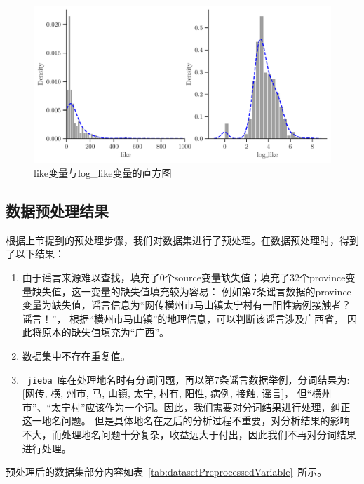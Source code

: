 \begin{figure}[!ht]
    \includegraphics[width=\linewidth]{../figures/loglike_like_hist}
    \caption{like变量与log\_like变量的直方图}
    \label{fig:like_loglike_hist}
\end{figure}

\subsection{数据预处理结果}

根据上节提到的预处理步骤，我们对数据集进行了预处理。在数据预处理时，得到了以下结果：
\begin{enumerate}
    \item 由于谣言来源难以查找，填充了0个source变量缺失值；填充了32个province变量缺失值，这一变量的缺失值填充较为容易：
    例如第7条谣言数据的province变量为缺失值，谣言信息为“网传横州市马山镇太宁村有一阳性病例接触者？谣言！”，
    根据“横州市马山镇”的地理信息，可以判断该谣言涉及广西省，
    因此将原本的缺失值填充为“广西”。
    \item 数据集中不存在重复值。
    \item ~\verb|jieba|~库在处理地名时有分词问题，再以第7条谣言数据举例，分词结果为:[网传, 横, 州市, 马, 山镇, 太宁, 村有, 阳性, 病例, 接触, 谣言]，
    但“横州市”、“太宁村”应该作为一个词。因此，我们需要对分词结果进行处理，纠正这一地名问题。
    但是具体地名在之后的分析过程不重要，对分析结果的影响不大，而处理地名问题十分复杂，收益远大于付出，因此我们不再对分词结果进行处理。
\end{enumerate}

预处理后的数据集部分内容如表~\ref{tab:datasetPreprocessedVariable}~所示。

